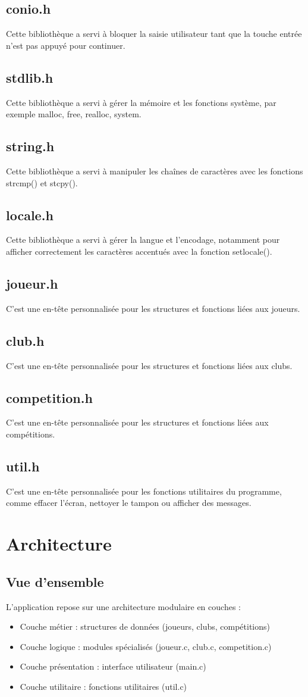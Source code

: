 \documentclass[12pt,a4paper]{report}
\begin{document}
\section{conio.h}
Cette bibliothèque a servi à bloquer la saisie utilisateur tant que la touche entrée n'est pas appuyé pour continuer.
\section{stdlib.h}
Cette bibliothèque a servi à gérer la mémoire et les fonctions système, par exemple malloc, free, realloc, system.
\section{string.h}
Cette bibliothèque a servi à manipuler les chaînes de caractères avec les fonctions strcmp() et stcpy().
\section{locale.h}
Cette bibliothèque a servi à gérer la langue et l'encodage, notamment pour afficher correctement les caractères accentués avec la fonction setlocale().
\section{joueur.h}
C'est une en-tête personnalisée pour les structures et fonctions liées aux joueurs.
\section{club.h}
C'est une en-tête personnalisée pour les structures et fonctions liées aux clubs.
\section{competition.h}
C'est une en-tête personnalisée pour les structures et fonctions liées aux compétitions.
\section{util.h}
C'est une en-tête personnalisée pour les fonctions utilitaires du programme, comme effacer l’écran, nettoyer le tampon ou afficher des messages.
\chapter{Architecture}
\section{Vue d'ensemble}
L'application repose sur une architecture modulaire en couches :
\begin{itemize}
\item Couche métier : structures de données (joueurs, clubs, compétitions)
\item Couche logique : modules spécialisés (joueur.c, club.c, competition.c)
\item Couche présentation : interface utilisateur (main.c)
\item Couche utilitaire : fonctions utilitaires (util.c)
\end{itemize}	
\end{document}
